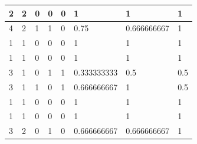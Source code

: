 \begin{small}
\begin{longtable}{|l|l|l|l|l|l|l|l|}
2  & 2                                & 0                                & 0                                & 0                                & 1                                      & 1                                       & 1                                    \\ \hline
4  & 2                                & 1                                & 1                                & 0                                & 0.75                                   & 0.666666667                             & 1                                    \\ \hline
1  & 1                                & 0                                & 0                                & 0                                & 1                                      & 1                                       & 1                                    \\ \hline
1  & 1                                & 0                                & 0                                & 0                                & 1                                      & 1                                       & 1                                    \\ \hline
3  & 1                                & 0                                & 1                                & 1                                & 0.333333333                            & 0.5                                     & 0.5                                  \\ \hline
3  & 1                                & 1                                & 0                                & 1                                & 0.666666667                            & 1                                       & 0.5                                  \\ \hline
1  & 1                                & 0                                & 0                                & 0                                & 1                                      & 1                                       & 1                                    \\ \hline
1  & 1                                & 0                                & 0                                & 0                                & 1                                      & 1                                       & 1                                    \\ \hline
3  & 2                                & 0                                & 1                                & 0                                & 0.666666667                            & 0.666666667                             & 1                                    \\ \hline

\end{longtable}
\end{small}
